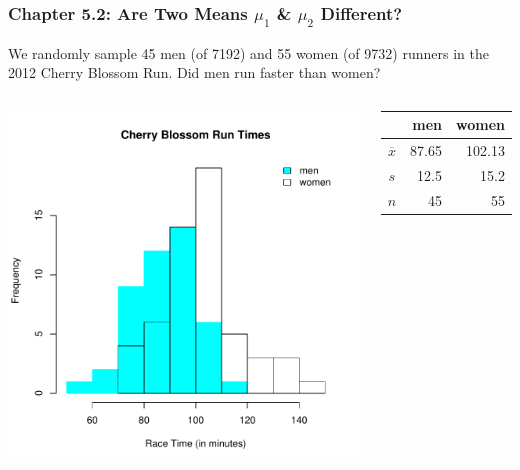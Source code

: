 \documentclass[handout]{beamer}
\begin{document}
%
%
\begin{frame}[fragile]
\frametitle{Chapter 5.2: Are Two Means $\mu_1$ \& $\mu_2$ Different?}

We randomly sample 45 men (of 7192) and 55 women (of 9732) runners in the 2012 Cherry Blossom Run. Did men run faster than women?

\begin{columns}
\pause{}
\begin{center}
\includegraphics[width=\textwidth]{figure/race.pdf}
\end{center}
\pause{}
\begin{center}
\begin{tabular}{c|rr}
     & men & women \\ 
\hline
    $\overline{x}$ & 87.65 & 102.13 \\ 
    $s$ & 12.5 & 15.2 \\ 
    $n$ & 45 & 55 \\ 
\end{tabular}
\end{center}
\end{columns}

\end{frame}
\end{document}
